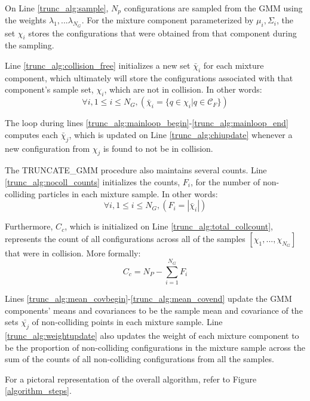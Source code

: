 \documentclass[journal]{IEEEtran}
\begin{document}
On Line \ref{trunc_alg:sample}, $N_p$ configurations are sampled from the GMM using the weights $\lambda_1,...\lambda_{N_G}$. For the mixture component parameterized by $\mu_i, \Sigma_i$, the set $\chi_i$ stores the configurations that were obtained from that component during the sampling.

Line \ref{trunc_alg:collision_free} initializes a new set $\bar{\chi}_i$ for each mixture component, which ultimately will store the configurations associated with that component's sample set, $\chi_i$, which are not in collision. In other words:
$$\forall i, 1 \leq i \leq N_{G}, ( \bar{\chi}_i  = \{q \in \chi_i | q \in \mathcal{C}_F \})$$

The loop during lines \ref{trunc_alg:mainloop_begin}-\ref{trunc_alg:mainloop_end} computes each $\bar{\chi}_j$, which is updated on Line \ref{trunc_alg:chiupdate} whenever a new configuration from $\chi_j$ is found to not be in collision.

The TRUNCATE\_GMM procedure also maintains several counts. Line \ref{trunc_alg:nocoll_counts} initializes the counts, $F_i$, for the number of non-colliding particles in each mixture sample. In other words:
$$\forall i, 1 \leq i \leq N_{G}, ( F_i = |\bar{\chi}_i|)$$

Furthermore, $C_c$, which is initialized on Line \ref{trunc_alg:total_collcount}, represents the count of all configurations across all of the samples $[\chi_1,...,\chi_{N_G}]$ that were in collision. More formally:
$$C_c = N_{P} - \sum_{i=1}^{N_G}F_i$$

Lines \ref{trunc_alg:mean_covbegin}-\ref{trunc_alg:mean_covend} update the GMM components' means and covariances to be the sample mean and covariance of the sets $\bar{\chi_j}$ of non-colliding points in each mixture sample. Line \ref{trunc_alg:weightupdate} also updates the weight of each mixture component to be the proportion of non-colliding configurations in the mixture sample across the sum of the counts of all non-colliding configurations from all the samples.

For a pictoral representation of the overall algorithm, refer to Figure \ref{algorithm_steps}.


\end{document}
